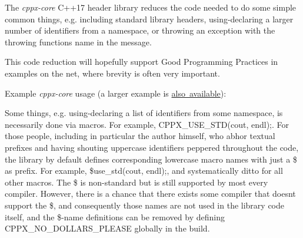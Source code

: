 The {\itshape cppx-\/core} C++17 header library reduces the code needed to do some simple common things, e.\+g. including standard library headers, {\ttfamily using}-\/declaring a larger number of identifiers from a namespace, or throwing an exception with the throwing function\textquotesingle{}s name in the message.

This code reduction will hopefully support Good Programming Practices\texttrademark{} in examples on the net, where brevity is often very important.

Example {\itshape cppx-\/core} usage (a larger example is \mbox{\hyperlink{md_example-kwic}{also available}})\+:


\begin{DoxyCode}{0}
\DoxyCodeLine{\textcolor{comment}{// → examples/hello.cpp}}
\DoxyCodeLine{\textcolor{preprocessor}{\#include <cppx-core/\_all\_.hpp>}}
\DoxyCodeLine{}
\DoxyCodeLine{\{}
\DoxyCodeLine{    \{}
\DoxyCodeLine{    \}}
\DoxyCodeLine{\}}
\end{DoxyCode}



\begin{DoxyCode}{0}
\end{DoxyCode}
 





Some things, e.\+g. {\ttfamily using}-\/declaring a list of identifiers from some namespace, is necessarily done via macros. For example, {\ttfamily C\+P\+P\+X\+\_\+\+U\+S\+E\+\_\+\+S\+T\+D(cout, endl);}. For those people, including in particular the author himself, who abhor textual prefixes and having shouting uppercase identifiers peppered throughout the code, the library by default defines corresponding lowercase macro names with just a {\ttfamily \$} as prefix. For example, {\ttfamily \$use\+\_\+std(cout, endl);}, and systematically ditto for all other macros. The {\ttfamily \$} is non-\/standard but is still supported by most every compiler. However, there is a chance that there exists some compiler that doesn\textquotesingle{}t support the {\ttfamily \$}, and consequently those names are not used in the library code itself, and the {\ttfamily \$}-\/name definitions can be removed by defining {\ttfamily C\+P\+P\+X\+\_\+\+N\+O\+\_\+\+D\+O\+L\+L\+A\+R\+S\+\_\+\+P\+L\+E\+A\+SE} globally in the build.

